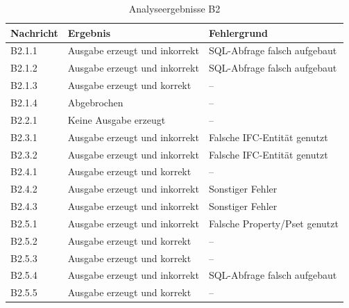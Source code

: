 \begin{table}[h]
    \centering
    \caption{Analyseergebnisse B2}
    \begin{tabular}{C{1.75cm} | C{5cm} | C{5.25cm}}
        \hline
        \textbf{Nachricht} & \textbf{Ergebnis} & \textbf{Fehlergrund} \\
        \hline
        B2.1.1 & Ausgabe erzeugt und inkorrekt & SQL-Abfrage falsch aufgebaut \\
        B2.1.2 & Ausgabe erzeugt und inkorrekt & SQL-Abfrage falsch aufgebaut \\
        B2.1.3 & Ausgabe erzeugt und korrekt & -- \\
        B2.1.4 & Abgebrochen & -- \\
        B2.2.1 & Keine Ausgabe erzeugt & -- \\
        B2.3.1 & Ausgabe erzeugt und inkorrekt & Falsche IFC-Entität genutzt \\
        B2.3.2 & Ausgabe erzeugt und inkorrekt & Falsche IFC-Entität genutzt \\
        B2.4.1 & Ausgabe erzeugt und korrekt & -- \\
        B2.4.2 & Ausgabe erzeugt und inkorrekt & Sonstiger Fehler \\
        B2.4.3 & Ausgabe erzeugt und inkorrekt & Sonstiger Fehler \\
        B2.5.1 & Ausgabe erzeugt und inkorrekt & Falsche Property/Pset genutzt \\
        B2.5.2 & Ausgabe erzeugt und korrekt & -- \\
        B2.5.3 & Ausgabe erzeugt und korrekt & -- \\
        B2.5.4 & Ausgabe erzeugt und inkorrekt & SQL-Abfrage falsch aufgebaut \\
        B2.5.5 & Ausgabe erzeugt und korrekt & -- \\
        \hline
    \end{tabular}
\end{table}

